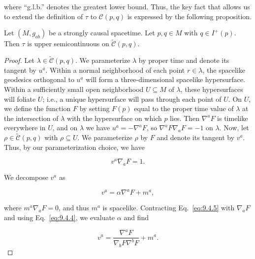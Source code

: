 where ``g.l.b.'' denotes the greatest lower bound. Thus, the key fact that allows us
to extend the definition of \(\tau\) to \(\mathcal C(p,q)\) is expressed by the following
proposition.



\begin{proposition}\label{prop:9.4.1}
Let \((M,g_{ab})\) be a strongly causal spacetime. Let \(p,q\in M\) with
\(q\in I^+(p)\). Then \(\tau\) is upper semicontinuous on
\(\widetilde{\mathcal C}(p,q)\).
\end{proposition}

\begin{proof}
Let \(\lambda\in\widetilde{\mathcal C}(p,q)\). We parameterize \(\lambda\) by proper
time and denote its tangent by \(u^a\). Within a normal neighborhood of each point
\(r\in\lambda\), the spacelike geodesics orthogonal to \(u^a\) will form a
three-dimensional spacelike hypersurface. Within a sufficiently small open
neighborhood \(U\subseteq M\) of \(\lambda\), these hypersurfaces will foliate \(U\);
i.e., a unique hypersurface will pass through each point of \(U\). On \(U\), we define
the function \(F\) by setting \(F(p)\) equal to the proper time value of \(\lambda\) at
the intersection of \(\lambda\) with the hypersurface on which \(p\) lies. Then
\(\nabla^aF\) is timelike everywhere in \(U\), and on \(\lambda\) we have
\(u^a=-\nabla^aF\), so \(\nabla^aF\nabla_aF=-1\) on \(\lambda\). Now, let
\(\rho\in\widetilde{\mathcal C}(p,q)\) with \(\rho\subseteq U\). We parameterize
\(\rho\) by \(F\) and denote its tangent by \(v^a\). Thus, by our parameterization
choice, we have

\begin{equation}
  v^a\nabla_aF=1 .
  \tag{9.4.4}\label{eq:9.4.4}
\end{equation}

We decompose \(v^a\) as

\begin{equation}
  v^a=\alpha\nabla^aF+m^a ,
  \tag{9.4.5}\label{eq:9.4.5}
\end{equation}

where \(m^a\nabla_aF=0\), and thus \(m^a\) is spacelike. Contracting
Eq.~\eqref{eq:9.4.5} with \(\nabla_aF\) and using Eq.~\eqref{eq:9.4.4}, we evaluate
\(\alpha\) and find

\begin{equation}
  v^a=\frac{\nabla^aF}{\nabla_bF\nabla^bF}+m^a .
  \tag{9.4.6}\label{eq:9.4.6}
\end{equation}


\end{proof}
